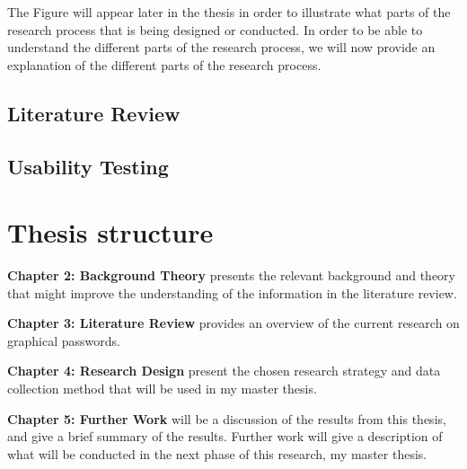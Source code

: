     The Figure will appear later in the thesis in order to illustrate what parts of the research process that is being designed or conducted. In order to be able to understand the different parts of the research process, we will now provide an explanation of the different parts of the research process. 


    \subsection{Literature Review}\label{sec:methodliteraturereview}

    \subsection{Usability Testing} \label{sec:methodusabilitytesting}

  \section{Thesis structure}

    {\bf Chapter 2: Background Theory} presents the relevant background and theory that might improve the understanding of the information in the literature review. 

    {\bf Chapter 3: Literature Review} provides an overview of the current research on graphical passwords. 

    {\bf Chapter 4: Research Design} present the chosen research strategy and data collection method that will be used in my master thesis. 

    {\bf Chapter 5: Further Work} will be a discussion of the results from this thesis, and give a brief summary of the results. Further work will give a description of what will be conducted in the next phase of this research, my master thesis.  





